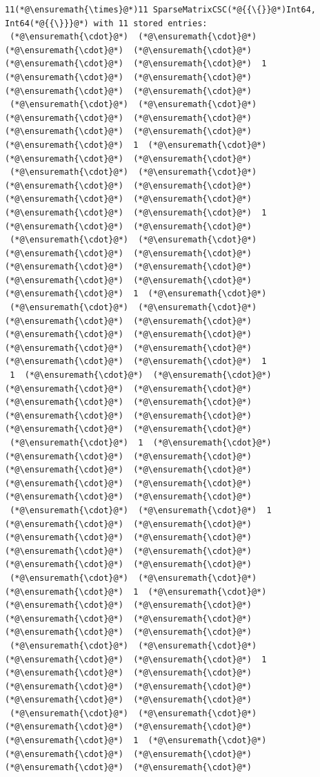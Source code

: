 \documentclass[12pt,landscape]{article}
\begin{document}
{\begin{lstlisting}
11(*@\ensuremath{\times}@*)11 SparseMatrixCSC(*@{{\{}}@*)Int64, Int64(*@{{\}}}@*) with 11 stored entries:
 (*@\ensuremath{\cdot}@*)  (*@\ensuremath{\cdot}@*)  (*@\ensuremath{\cdot}@*)  (*@\ensuremath{\cdot}@*)  (*@\ensuremath{\cdot}@*)  (*@\ensuremath{\cdot}@*)  1  (*@\ensuremath{\cdot}@*)  (*@\ensuremath{\cdot}@*)  (*@\ensuremath{\cdot}@*)  (*@\ensuremath{\cdot}@*)
 (*@\ensuremath{\cdot}@*)  (*@\ensuremath{\cdot}@*)  (*@\ensuremath{\cdot}@*)  (*@\ensuremath{\cdot}@*)  (*@\ensuremath{\cdot}@*)  (*@\ensuremath{\cdot}@*)  (*@\ensuremath{\cdot}@*)  1  (*@\ensuremath{\cdot}@*)  (*@\ensuremath{\cdot}@*)  (*@\ensuremath{\cdot}@*)
 (*@\ensuremath{\cdot}@*)  (*@\ensuremath{\cdot}@*)  (*@\ensuremath{\cdot}@*)  (*@\ensuremath{\cdot}@*)  (*@\ensuremath{\cdot}@*)  (*@\ensuremath{\cdot}@*)  (*@\ensuremath{\cdot}@*)  (*@\ensuremath{\cdot}@*)  1  (*@\ensuremath{\cdot}@*)  (*@\ensuremath{\cdot}@*)
 (*@\ensuremath{\cdot}@*)  (*@\ensuremath{\cdot}@*)  (*@\ensuremath{\cdot}@*)  (*@\ensuremath{\cdot}@*)  (*@\ensuremath{\cdot}@*)  (*@\ensuremath{\cdot}@*)  (*@\ensuremath{\cdot}@*)  (*@\ensuremath{\cdot}@*)  (*@\ensuremath{\cdot}@*)  1  (*@\ensuremath{\cdot}@*)
 (*@\ensuremath{\cdot}@*)  (*@\ensuremath{\cdot}@*)  (*@\ensuremath{\cdot}@*)  (*@\ensuremath{\cdot}@*)  (*@\ensuremath{\cdot}@*)  (*@\ensuremath{\cdot}@*)  (*@\ensuremath{\cdot}@*)  (*@\ensuremath{\cdot}@*)  (*@\ensuremath{\cdot}@*)  (*@\ensuremath{\cdot}@*)  1
 1  (*@\ensuremath{\cdot}@*)  (*@\ensuremath{\cdot}@*)  (*@\ensuremath{\cdot}@*)  (*@\ensuremath{\cdot}@*)  (*@\ensuremath{\cdot}@*)  (*@\ensuremath{\cdot}@*)  (*@\ensuremath{\cdot}@*)  (*@\ensuremath{\cdot}@*)  (*@\ensuremath{\cdot}@*)  (*@\ensuremath{\cdot}@*)
 (*@\ensuremath{\cdot}@*)  1  (*@\ensuremath{\cdot}@*)  (*@\ensuremath{\cdot}@*)  (*@\ensuremath{\cdot}@*)  (*@\ensuremath{\cdot}@*)  (*@\ensuremath{\cdot}@*)  (*@\ensuremath{\cdot}@*)  (*@\ensuremath{\cdot}@*)  (*@\ensuremath{\cdot}@*)  (*@\ensuremath{\cdot}@*)
 (*@\ensuremath{\cdot}@*)  (*@\ensuremath{\cdot}@*)  1  (*@\ensuremath{\cdot}@*)  (*@\ensuremath{\cdot}@*)  (*@\ensuremath{\cdot}@*)  (*@\ensuremath{\cdot}@*)  (*@\ensuremath{\cdot}@*)  (*@\ensuremath{\cdot}@*)  (*@\ensuremath{\cdot}@*)  (*@\ensuremath{\cdot}@*)
 (*@\ensuremath{\cdot}@*)  (*@\ensuremath{\cdot}@*)  (*@\ensuremath{\cdot}@*)  1  (*@\ensuremath{\cdot}@*)  (*@\ensuremath{\cdot}@*)  (*@\ensuremath{\cdot}@*)  (*@\ensuremath{\cdot}@*)  (*@\ensuremath{\cdot}@*)  (*@\ensuremath{\cdot}@*)  (*@\ensuremath{\cdot}@*)
 (*@\ensuremath{\cdot}@*)  (*@\ensuremath{\cdot}@*)  (*@\ensuremath{\cdot}@*)  (*@\ensuremath{\cdot}@*)  1  (*@\ensuremath{\cdot}@*)  (*@\ensuremath{\cdot}@*)  (*@\ensuremath{\cdot}@*)  (*@\ensuremath{\cdot}@*)  (*@\ensuremath{\cdot}@*)  (*@\ensuremath{\cdot}@*)
 (*@\ensuremath{\cdot}@*)  (*@\ensuremath{\cdot}@*)  (*@\ensuremath{\cdot}@*)  (*@\ensuremath{\cdot}@*)  (*@\ensuremath{\cdot}@*)  1  (*@\ensuremath{\cdot}@*)  (*@\ensuremath{\cdot}@*)  (*@\ensuremath{\cdot}@*)  (*@\ensuremath{\cdot}@*)  (*@\ensuremath{\cdot}@*)
\end{lstlisting}


}
\end{document}
